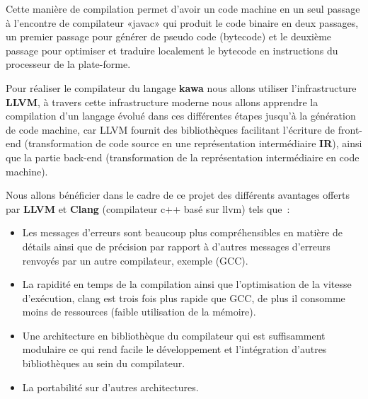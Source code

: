 \documentclass{../res/univ-projet}
\begin{document}
 Cette manière de compilation permet d'avoir un code machine en un seul passage à l'encontre de compilateur «javac» qui produit le code binaire en deux passages, un premier passage  pour générer de pseudo code (bytecode) et le deuxième passage  pour optimiser et traduire localement le bytecode en instructions du processeur de la plate-forme.

Pour réaliser le compilateur du langage \textbf {kawa} nous allons utiliser l'infrastructure \textbf {LLVM}, à travers cette infrastructure moderne nous allons apprendre la compilation d'un langage évolué dans ces différentes étapes jusqu'à la génération de code machine, car LLVM fournit des bibliothèques facilitant l’écriture de front-end (transformation de code source en une représentation intermédiaire \textbf {IR}), ainsi que la partie  back-end (transformation de la représentation intermédiaire en code machine).

Nous allons  bénéficier dans le cadre de ce projet des différents avantages offerts par \textbf {LLVM} et \textbf {Clang} (compilateur c++ basé sur llvm) tels que :
\begin{itemize}
\item Les messages d’erreurs sont beaucoup plus compréhensibles en matière de détails ainsi que de précision par rapport à d'autres messages d'erreurs renvoyés par un autre compilateur, exemple (GCC).
\item La rapidité en temps de la compilation ainsi que l'optimisation de la vitesse d'exécution, clang est trois fois plus rapide que GCC, de plus il consomme moins de ressources (faible utilisation de la mémoire).
\item Une architecture en bibliothèque du compilateur qui est suffisamment modulaire ce qui rend facile le développement et l'intégration d'autres bibliothèques au sein du compilateur.
\item La portabilité sur d'autres architectures.
\end{itemize}

\end{document}
